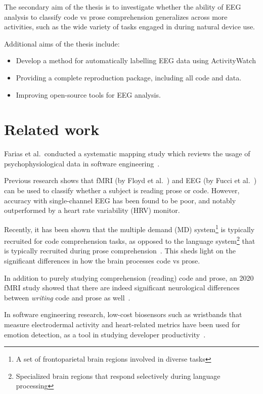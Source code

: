     The secondary aim of the thesis is to investigate whether the ability of EEG analysis to classify code vs prose comprehension generalizes across more activities, such as the wide variety of tasks engaged in during natural device use.

    Additional aims of the thesis include:

    \begin{itemize}
        \item Develop a method for automatically labelling EEG data using ActivityWatch
        \item Providing a complete reproduction package, including all code and data.
        \item Improving open-source tools for EEG analysis.
    \end{itemize}


\section{Related work}

    Farias et al.\ conducted a systematic mapping study which reviews the usage of psychophysiological data in software engineering~\cite{vieira_usage_2021}.

    Previous research shows that fMRI (by Floyd et al.~\cite{floyd_decoding_2017}) and EEG (by Fucci et al.~\cite{fucci_replication_2019}) can be used to classify whether a subject is reading prose or code. However, accuracy with single-channel EEG has been found to be poor, and notably outperformed by a heart rate variability (HRV) monitor.

    Recently, it has been shown that the multiple demand (MD) system\footnote{A set of frontoparietal brain regions involved in diverse tasks} is typically recruited for code comprehension tasks, as opposed to the language system\footnote{Specialized brain regions that respond selectively during language processing} that is typically recruited during prose comprehension~\cite{ivanova_comprehension_2020}. This sheds light on the significant differences in how the brain processes code vs prose.

    In addition to purely studying comprehension (reading) code and prose, an 2020 fMRI study showed that there are indeed significant neurological differences between \emph{writing} code and prose as well~\cite{noauthor_neurological_nodate}.

    In software engineering research, low-cost biosensors such as wristbands that measure electrodermal activity and heart-related metrics have been used for emotion detection, as a tool in studying developer productivity~\cite{girardi_recognizing_2020}.

